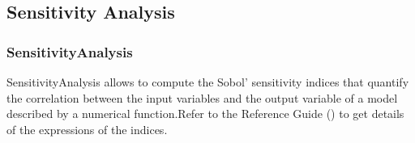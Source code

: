 \newpage
\subsection{Sensitivity Analysis}
\subsubsection{SensitivityAnalysis}

SensitivityAnalysis allows to compute the Sobol' sensitivity indices that quantify the correlation between the input variables and the output variable of a model described by a numerical function.Refer to  the Reference Guide () to get details of the expressions of the indices.

